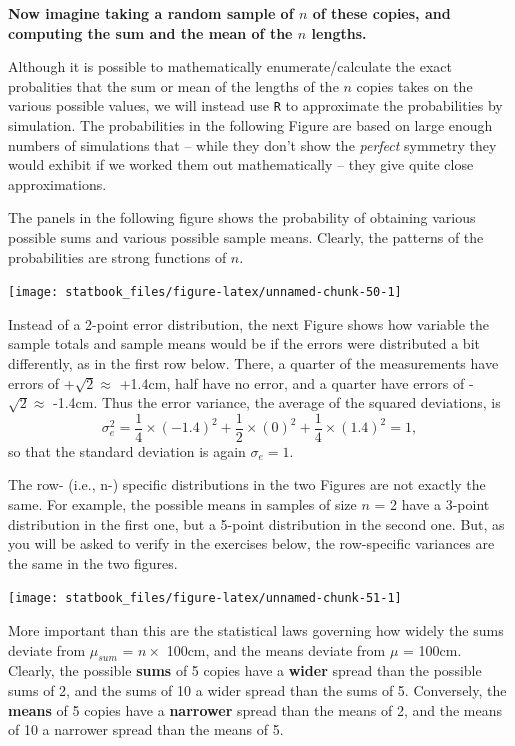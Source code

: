 \documentclass[]{book}
\begin{document}
\textbf{Now imagine taking a random sample of \(n\) of these copies, and computing the sum and the mean of the \(n\) lengths.}

Although it is possible to mathematically enumerate/calculate the exact probalities that the sum or mean of the lengths of the \(n\) copies takes on the various possible values, we will instead use \texttt{R} to approximate the probabilities by simulation. The probabilities in the following Figure are based on large enough numbers of simulations that -- while they don't show the \emph{perfect} symmetry they would exhibit if we worked them out mathematically -- they give quite close approximations.

The panels in the following figure shows the probability of obtaining various possible sums and various possible sample means. Clearly, the patterns of the probabilities are strong functions of \(n.\)

\begin{center}\texttt{[image: statbook\_files/figure-latex/unnamed-chunk-50-1]} \end{center}

Instead of a 2-point error distribution, the next Figure shows how variable the sample totals and sample means would be if the errors were distributed a bit differently, as in the first row below. There, a quarter of the measurements have errors of +\(\sqrt{2} \approx\) +1.4cm, half have no error, and a quarter have errors of -\(\sqrt{2} \approx\) -1.4cm. Thus the error variance, the average of the squared deviations, is
\[\sigma_e^2 = \frac{1}{4} \times (-1.4)^2  +  \frac{1}{2} \times (0)^2 +  \frac{1}{4} \times (1.4)^2 = 1,\] so that the standard deviation is again \(\sigma_e = 1.\)

The row- (i.e., n-) specific distributions in the two Figures are not exactly the same. For example, the possible means in samples of size \(n\) = 2 have a 3-point distribution in the first one, but a 5-point distribution in the second one. But, as you will be asked to verify in the exercises below, the row-specific variances are the same in the two figures.

\begin{center}\texttt{[image: statbook\_files/figure-latex/unnamed-chunk-51-1]} \end{center}

More important than this are the statistical laws governing how widely the sums deviate from \(\mu_{sum}\) = \(n \times\) 100cm, and the means deviate from \(\mu\) = 100cm. Clearly, the possible \textbf{sums} of 5 copies have a \textbf{wider} spread than the possible sums of 2, and the sums of 10 a wider spread than the sums of 5. Conversely, the \textbf{means} of 5 copies have a \textbf{narrower} spread than the means of 2, and the means of 10 a narrower spread than the means of 5.
\end{document}
